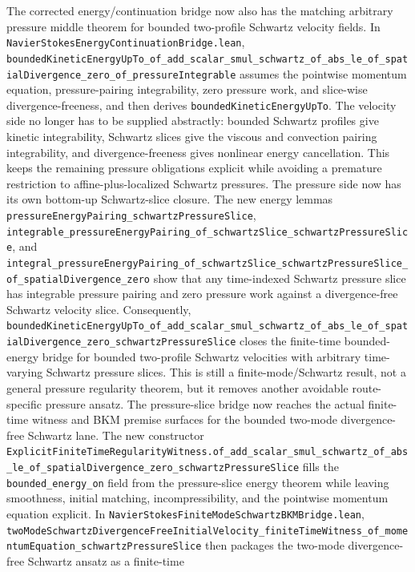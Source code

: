 \documentclass[11pt]{article}
\theoremstyle{remark}
\begin{document}
The corrected energy/continuation bridge now also has the matching arbitrary
pressure middle theorem for bounded two-profile Schwartz velocity fields.  In
\texttt{NavierStokesEnergyContinuationBridge.lean},
\texttt{boundedKineticEnergyUpTo\_of\_add\_scalar\_smul\_schwartz\_of\_abs\_le\_of\_spatialDivergence\_zero\_of\_pressureIntegrable}
assumes the pointwise momentum equation, pressure-pairing integrability, zero
pressure work, and slice-wise divergence-freeness, and then derives
\texttt{boundedKineticEnergyUpTo}.  The velocity side no longer has to be
supplied abstractly: bounded Schwartz profiles give kinetic integrability,
Schwartz slices give the viscous and convection pairing integrability, and
divergence-freeness gives nonlinear energy cancellation.  This keeps the
remaining pressure obligations explicit while avoiding a premature restriction
to affine-plus-localized Schwartz pressures.
The pressure side now has its own bottom-up Schwartz-slice closure.  The new
energy lemmas
\texttt{pressureEnergyPairing\_schwartzPressureSlice},
\texttt{integrable\_pressureEnergyPairing\_of\_schwartzSlice\_schwartzPressureSlice},
and
\texttt{integral\_pressureEnergyPairing\_of\_schwartzSlice\_schwartzPressureSlice\_of\_spatialDivergence\_zero}
show that any time-indexed Schwartz pressure slice has integrable pressure
pairing and zero pressure work against a divergence-free Schwartz velocity
slice.  Consequently,
\texttt{boundedKineticEnergyUpTo\_of\_add\_scalar\_smul\_schwartz\_of\_abs\_le\_of\_spatialDivergence\_zero\_schwartzPressureSlice}
closes the finite-time bounded-energy bridge for bounded two-profile Schwartz
velocities with arbitrary time-varying Schwartz pressure slices.  This is still
a finite-mode/Schwartz result, not a general pressure regularity theorem, but
it removes another avoidable route-specific pressure ansatz.
The pressure-slice bridge now reaches the actual finite-time witness and BKM
premise surfaces for the bounded two-mode divergence-free Schwartz lane.  The
new constructor
\texttt{ExplicitFiniteTimeRegularityWitness.of\_add\_scalar\_smul\_schwartz\_of\_abs\_le\_of\_spatialDivergence\_zero\_schwartzPressureSlice}
fills the \texttt{bounded\_energy\_on} field from the pressure-slice energy
theorem while leaving smoothness, initial matching, incompressibility, and the
pointwise momentum equation explicit.  In
\texttt{NavierStokesFiniteModeSchwartzBKMBridge.lean},
\texttt{twoModeSchwartzDivergenceFreeInitialVelocity\_finiteTimeWitness\_of\_momentumEquation\_schwartzPressureSlice}
then packages the two-mode divergence-free Schwartz ansatz as a finite-time
\end{document}
